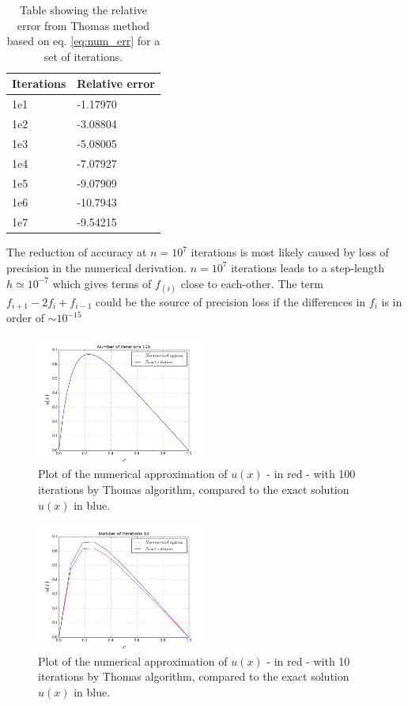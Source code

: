 \documentclass[twoside,twocolumn]{article}
\begin{document}
\begin{table}[htp]
\centering
\begin{tabular}{|l|l|} \hline
Iterations & Relative error\\ \hline
1e1 & -1.17970\\
1e2 & -3.08804\\
1e3 & -5.08005\\
1e4 & -7.07927\\
1e5 & -9.07909\\
1e6 & -10.7943\\
1e7 & -9.54215\\ \hline
\end{tabular}
\caption{Table showing the relative error from Thomas method based on eq. \ref{eq:num_err} for a set of iterations.}\label{tbl:error}
\end{table}

\newpage

The reduction of accuracy at $n=10^7$ iterations  is most likely caused by loss of precision in the numerical derivation. $n=10^7$ iterations leads to a step-length $h\simeq 10^{-7}$ which gives terms of $f_(i)$ close to each-other. The term $f_{i+1}-2f_i+f_{i-1}$ could be the source of precision loss if the differences in $f_i$ is in order of $\sim10^{-15}$

\begin{figure}[htp]
\includegraphics[width=0.5\textwidth]{figures/b-run1e2.png} 
\caption{Plot of the numerical approximation of $u(x)$ - in red - with 100 iterations by Thomas algorithm, compared to the exact solution $u(x)$ in blue.} \label{fig:Thomas1E2}
\end{figure}

\begin{figure}[htp]
\includegraphics[width=0.5\textwidth]{figures/b-run10.png} 
\caption{Plot of the numerical approximation of $u(x)$ - in red - with 10 iterations by Thomas algorithm, compared to the exact solution $u(x)$ in blue.} \label{fig:Thomas10}
\end{figure}
\end{document}
